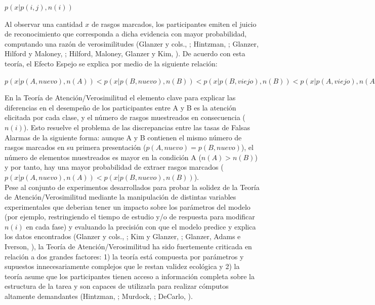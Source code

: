 \begin{center}
$p(x|p(i,j),n(i))$\\
\end{center}

Al observar una cantidad $x$ de rasgos marcados, los participantes emiten el juicio de reconocimiento que corresponda a dicha evidencia con mayor probabilidad, computando una razón de verosimilitudes (Glanzer y cols., \citeyear{Glanzer1993}; Hintzman, \citeyear{Hintzman1994}; Glanzer, Hilford y Maloney, \citeyear{Glanzer2009}; Hilford, Maloney, Glanzer y Kim, \citeyear{Hilford2015}). De acuerdo con esta teoría, el Efecto Espejo se explica por medio de la siguiente relación:

\begin{center}
$p(x|p(A,nuevo),n(A)) < p(x|p(B,nuevo),n(B)) < p(x|p(B,viejo),n(B)) < p(x|p(A,viejo),n(A))$\\
\end{center}

En la Teoría de Atención/Verosimilitud el elemento clave para explicar las diferencias en el desempeño de los participantes entre A y B es la atención elicitada por cada clase, y el número de rasgos muestreados en consecuencia ($n(i)$). Esto resuelve el problema de las discrepancias entre las tasas de Falsas Alarmas de la siguiente forma: aunque A y B contienen el mismo número de rasgos marcados en su primera presentación ($p(A,nuevo) = p(B,nuevo)$), el número de elementos muestreados es mayor en la condición A ($n(A) > n(B)$) y por tanto, hay una mayor probabilidad de extraer rasgos marcados ($p(x|p(A,nuevo),n(A)) < p(x|p(B,nuevo),n(B))$).\\

Pese al conjunto de experimentos desarrollados para probar la solidez de la Teoría de Atención/Verosimilitud mediante la manipulación de distintas variables experimentales que deberian tener un impacto sobre los parámetros del modelo (por ejemplo, restringiendo el tiempo de estudio y/o de respuesta para modificar $n(i)$ en cada fase) y evaluando la precisión con que el modelo predice y explica los datos encontrados (Glanzer y cols., \citeyear{Glanzer1993}; Kim y Glanzer, \citeyear{Kim1993}; Glanzer, Adams e Iverson, \citeyear{Glanzer1991}), la Teoría de Atención/Verosimilitud ha sido fuertemente criticada en relación a dos grandes factores: 1) la teoría está compuesta por parámetros y supuestos innecesariamente complejos que le restan validez ecológica y 2) la teoría asume que los participantes tienen acceso a información completa sobre la estructura de la tarea y son capaces de utilizarla para realizar cómputos altamente demandantes (Hintzman, \citeyear{Hintzman1994}; Murdock, \citeyear{Murdock1998}; DeCarlo, \citeyear{DeCarlo2007}).\\

